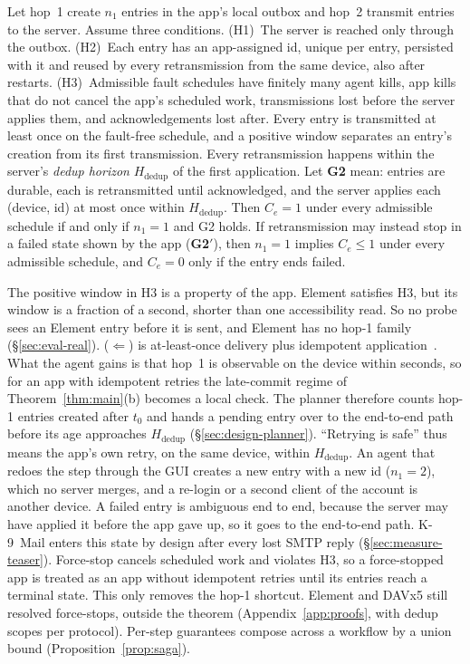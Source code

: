 \begin{theorem}
\label{thm:twohop}
Let hop~1 create $n_1$ entries in the app's local outbox and hop~2 transmit entries to the server. Assume three conditions.
(H1)~The server is reached only through the outbox.
(H2)~Each entry has an app-assigned id, unique per entry, persisted with it and reused by every retransmission from the same device, also after restarts.
(H3)~Admissible fault schedules have finitely many agent kills, app kills that do not cancel the app's scheduled work, transmissions lost before the server applies them,
and acknowledgements lost after. Every entry is transmitted at least once on the fault-free schedule, and a positive window separates an entry's creation from its first
transmission. Every retransmission happens within the server's \emph{dedup horizon} $H_{\mathrm{dedup}}$ of the first application.
Let \textbf{G2} mean: entries are durable, each is retransmitted until acknowledged, and the server applies each (device, id) at most once within $H_{\mathrm{dedup}}$. Then $C_e=1$ under every admissible
schedule if and only if $n_1=1$ and G2 holds. If retransmission may instead stop in a failed state shown by the app (\textbf{G2$'$}), then $n_1=1$ implies $C_e\le1$ under
every admissible schedule, and $C_e=0$ only if the entry ends failed.
\end{theorem}
The positive window in H3 is a property of the app. Element satisfies H3, but its window is a fraction of a second, shorter than one accessibility read. So no probe sees
an Element entry before it is sent, and Element has no hop-1 family (\S\ref{sec:eval-real}).
($\Leftarrow$) is at-least-once delivery plus idempotent application~\cite{helland2012idempotence,birrell1984rpc,wang2021kafka}. What the agent gains is that hop~1 is
observable on the device within seconds, so for an app with idempotent retries the late-commit regime of Theorem~\ref{thm:main}(b) becomes a local check. The planner therefore counts hop-1
entries created after $t_0$ and hands a pending entry over to the end-to-end path before its age approaches $H_{\mathrm{dedup}}$ (\S\ref{sec:design-planner}). ``Retrying is safe'' thus means the app's own retry, on the same device, within $H_{\mathrm{dedup}}$.
An agent that redoes the step through the GUI creates a new entry with a new id ($n_1{=}2$), which no server merges, and a re-login or a second client of the account is another device. A failed entry is
ambiguous end to end, because the server may have applied it before the app gave up, so it goes to the end-to-end path. K-9~Mail enters this state by design after every lost
SMTP reply (\S\ref{sec:measure-teaser}). Force-stop cancels scheduled work and violates H3, so a force-stopped app is treated as
an app without idempotent retries until its entries reach a terminal state. This only removes the hop-1 shortcut. Element and DAVx5 still resolved force-stops, outside the theorem (Appendix~\ref{app:proofs}, with dedup scopes per protocol). Per-step guarantees compose across a workflow by a union bound
(Proposition~\ref{prop:saga}).

